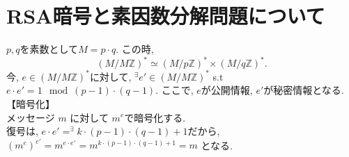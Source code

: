 \documentclass{jsarticle}
\theoremstyle{definition}
\begin{document}
\section{RSA暗号と素因数分解問題について}
$p,q $を素数として$M=p\cdot q.$ この時, 
\begin{equation}
 \left(M/ M\mathbb{Z} \right)^{*} \simeq   \left(M/ p \mathbb{Z} \right)^{*} \times  \left(M / q \mathbb{Z} \right)^{*}.
 \end{equation}
 今, $e \in  \left( M/ M\mathbb{Z} \right)^{*} $に対して, $^ \exists e' \in  \left( M/  M\mathbb{Z} \right)^{*} $ s.t  $e\cdot e' =1 \mod (p-1)\cdot (q-1)$. ここで, $e$が公開情報, $e'$が秘密情報となる.\\
 【暗号化】\\
 メッセージ $m$ に対して $m^e$で暗号化する.\\
 復号は, $e\cdot e' =^{\exists}k\cdot (p-1)\cdot (q-1)+ 1$だから, $(m^e)^{e'}=m^{e\cdot e'}=m^{k\cdot (p-1)\cdot (q-1)+1  }=m$ となる.
 
\end{document}
